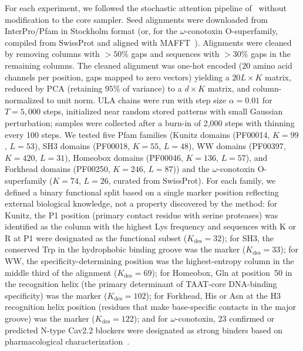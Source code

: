For each experiment, we followed the stochastic attention pipeline
of~\cite{varnerSAProtein2026} without modification to the core sampler. Seed alignments were
downloaded from InterPro/Pfam in Stockholm format (or, for the $\omega$-conotoxin
O-superfamily, compiled from SwissProt and aligned with MAFFT~\cite{mafft2013}). Alignments
were cleaned by removing columns with $>50\%$ gaps and sequences with $>30\%$ gaps in the
remaining columns. The cleaned alignment was one-hot encoded ($20$ amino acid channels per
position, gaps mapped to zero vectors) yielding a $20L \times K$ matrix, reduced by PCA
(retaining $95\%$ of variance) to a $d \times K$ matrix, and column-normalized to unit norm.
ULA chains were run with step size $\alpha = 0.01$ for $T = 5{,}000$ steps, initialized near
random stored patterns with small Gaussian perturbation; samples were collected after a
burn-in of 2{,}000 steps with thinning every 100 steps. We tested five Pfam families (Kunitz
domains (PF00014, $K=99$, $L=53$), SH3 domains (PF00018, $K=55$, $L=48$), WW domains
(PF00397, $K=420$, $L=31$), Homeobox domains (PF00046, $K=136$, $L=57$), and Forkhead domains
(PF00250, $K=246$, $L=87$)) and the $\omega$-conotoxin O-superfamily ($K=74$, $L=26$, curated
from SwissProt). For each family, we defined a binary functional split based on a single marker
position reflecting external biological knowledge, not a property discovered by the method: for
Kunitz, the P1 position (primary contact residue with serine proteases) was identified as the
column with the highest Lys frequency and sequences with K or R at P1 were designated as the
functional subset ($K_{\mathrm{des}} = 32$); for SH3, the conserved Trp in the hydrophobic
binding groove was the marker ($K_{\mathrm{des}} = 33$); for WW, the specificity-determining
position was the highest-entropy column in the middle third of the alignment
($K_{\mathrm{des}} = 69$); for Homeobox, Gln at position~50 in the recognition helix
(the primary determinant of TAAT-core DNA-binding specificity) was the marker
($K_{\mathrm{des}} = 102$); for Forkhead, His or Asn at the H3 recognition helix
position (residues that make base-specific contacts in the major groove) was the marker
($K_{\mathrm{des}} = 122$); and for $\omega$-conotoxin, 23 confirmed or predicted N-type Cav2.2
blockers were designated as strong binders based on pharmacological
characterization~\cite{omegaConotoxinSAR2006}.

